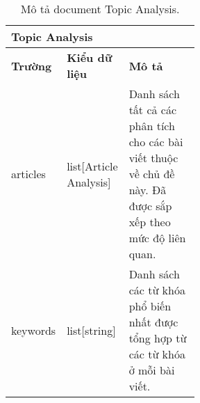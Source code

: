 \begin{table}[ht!]
    \centering
\begin{tabular}{|llp{0.54\linewidth}|}
\hline
\multicolumn{3}{|l|}{\textbf{Topic Analysis}}                                                                                                                                             \\ \hline
\multicolumn{1}{|l|}{\textbf{Trường}} & \multicolumn{1}{l|}{\textbf{Kiểu dữ liệu}}        & \textbf{Mô   tả}                                                                              \\ \hline
\multicolumn{1}{|l|}{articles}        & \multicolumn{1}{l|}{list{[}Article   Analysis{]}} & Danh   sách tất cả các phân tích cho các bài viết thuộc về chủ đề này. Đã được sắp xếp theo mức độ   liên quan. \\ \hline
\multicolumn{1}{|l|}{keywords}        & \multicolumn{1}{l|}{list{[}string{]}}             & Danh   sách các từ khóa phổ biến nhất được tổng hợp từ các từ khóa ở mỗi bài viết.            \\ \hline
\end{tabular}
    \caption{Mô tả document Topic Analysis.}
    \label{table:schema-topic-analysis}
\end{table}

